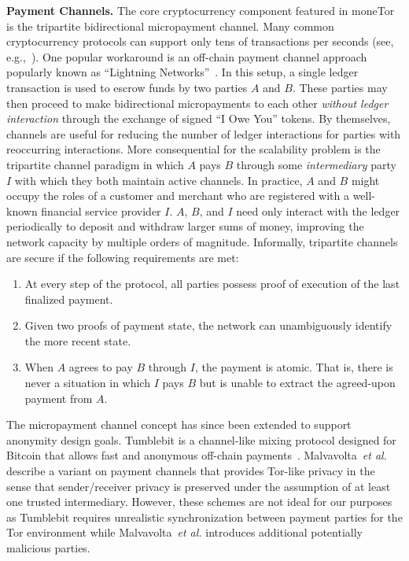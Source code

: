 \medskip
\noindent\textbf{Payment Channels.} The core cryptocurrency component featured
in moneTor is the tripartite bidirectional micropayment channel. Many
common cryptocurrency protocols can support only tens of
transactions per seconds (see, e.g.,~\cite{team2018blockchain}). One
popular workaround is an off-chain payment channel approach popularly known as
``Lightning Networks''~\cite{poon2016bitcoin}. In this setup, a single ledger
transaction is used to escrow funds by two parties $A$ and $B$. These parties
may then proceed to make bidirectional micropayments to each other \emph{without
  ledger interaction} through the exchange of signed ``I Owe You'' tokens. By
themselves, channels are useful for reducing the number of ledger interactions
for parties with reoccurring interactions. More consequential for the
scalability problem is the tripartite channel paradigm in which $A$ pays $B$
through some \emph{intermediary} party $I$ with which they both maintain active
channels. In practice, $A$ and $B$ might occupy the roles of a customer and
merchant who are registered with a well-known financial service provider $I$.
$A$, $B$, and $I$ need only interact with the ledger periodically to deposit and
withdraw larger sums of money, improving the network capacity by multiple orders
of magnitude. Informally, tripartite channels are secure if the following
requirements are met:

\begin{enumerate}
\item At every step of the protocol, all parties possess proof of execution of
  the last finalized payment.
\item Given two proofs of payment state, the network can unambiguously identify
  the more recent state.
\item When $A$ agrees to pay $B$ through $I$, the payment is atomic. That is,
  there is never a situation in which $I$ pays $B$ but is unable to extract the
  agreed-upon payment from $A$.
\end{enumerate}


 The micropayment channel concept has since been extended to support anonymity
 design goals. Tumblebit is a channel-like mixing protocol designed for Bitcoin
 that allows fast and anonymous off-chain payments~\cite{heilman2017tumblebit}.
 Malvavolta~\textit{et al.}~\cite{malavolta2017concurrency} describe a variant on
 payment channels that provides Tor-like privacy in the sense that
 sender/receiver privacy is preserved under the assumption of at least one
 trusted intermediary. However, these schemes are not ideal for our purposes as
 Tumblebit requires unrealistic synchronization between payment parties for the
 Tor environment while Malvavolta~\textit{et al.} introduces additional
 potentially malicious parties.

